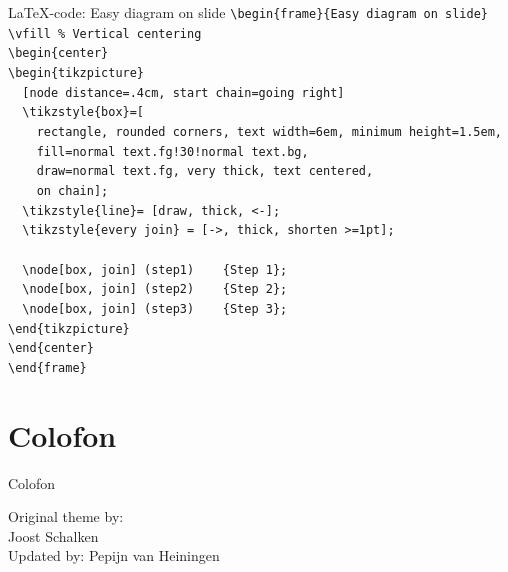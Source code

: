 \documentclass[t,11pt]{beamer}
\begin{document}
\toggleslidecolors
\begin{frame}[fragile]{\LaTeX-code: Easy diagram on slide}
\scriptsize
\verb|\begin{frame}{Easy diagram on slide}|\\
\verb|\vfill % Vertical centering|\\
\verb|\begin{center}|\\
\verb|\begin{tikzpicture}|\\
\verb|  [node distance=.4cm, start chain=going right]|\\
\verb|  \tikzstyle{box}=[|\\
\verb|    rectangle, rounded corners, text width=6em, minimum height=1.5em,|\\
\verb|    fill=normal text.fg!30!normal text.bg,|\\
\verb|    draw=normal text.fg, very thick, text centered,|\\
\verb|    on chain];|\\
\verb|  \tikzstyle{line}= [draw, thick, <-];|\\
\verb|  \tikzstyle{every join} = [->, thick, shorten >=1pt];|\\
\verb||\\
\verb|  \node[box, join] (step1)	{Step 1};|\\
\verb|  \node[box, join] (step2)	{Step 2};|\\
\verb|  \node[box, join] (step3)	{Step 3};|\\
\verb|\end{tikzpicture}|\\
\verb|\end{center}|\\
\verb|\end{frame}|\\
\end{frame}
\toggleslidecolors



\section{Colofon}


\begin{frame}{Colofon}
\vfill %
\begin{center}
\alert{\large Original theme by:}\\
{\LARGE Joost Schalken}\\
{\tiny Updated by: Pepijn van Heiningen}
\end{center}
\end{frame}
\end{document}
